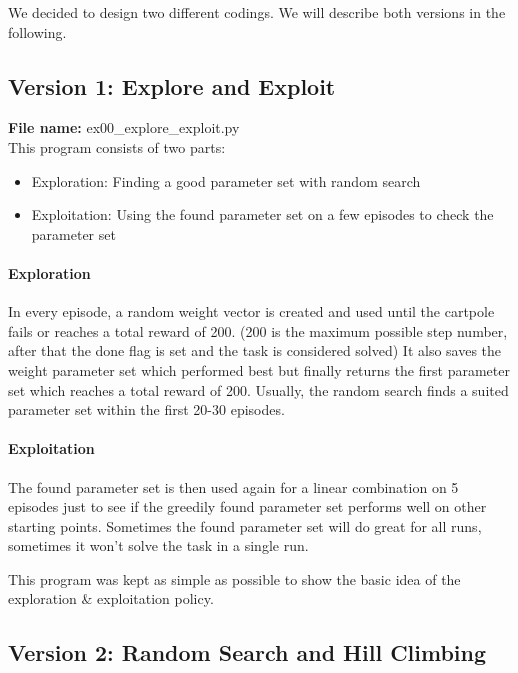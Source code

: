 \documentclass[a4paper, 11pt]{article}
\begin{document}
We decided to design two different codings. We will describe both versions in the following.

\subsection{Version 1: Explore and Exploit}

\textbf{File name:} ex00\_explore\_exploit.py\\
This program consists of two parts:
\begin{itemize}
	\item Exploration: Finding a good parameter set with random search
	\item Exploitation: Using the found parameter set on a few episodes to check the parameter set
\end{itemize}

\paragraph{Exploration}

In every episode, a random weight vector is created and used until the cartpole fails or reaches a total reward of 200. (200 is the maximum possible step number, after that the done flag is set and the task is considered solved) It also saves the weight parameter set which performed best but finally returns the first parameter set which reaches a total reward of 200.
Usually, the random search finds a suited parameter set within the first 20-30 episodes.

\paragraph{Exploitation}

The found parameter set is then used again for a linear combination on 5 episodes just to see if the greedily found parameter set performs well on other starting points.
Sometimes the found parameter set will do great for all runs, sometimes it won’t solve the task in a single run.

This program was kept as simple as possible to show the basic idea of the exploration \& exploitation policy.
\clearpage

\subsection{Version 2: Random Search and Hill Climbing}
\end{document}
